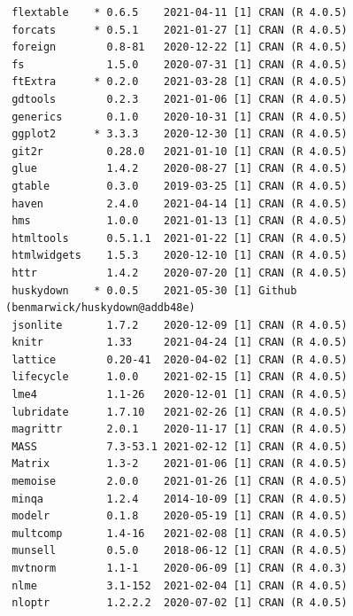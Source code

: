 \documentclass [11pt, proquest] {uwthesis}[2015/03/03]
\begin{document}
\begin{verbatim}
 flextable    * 0.6.5    2021-04-11 [1] CRAN (R 4.0.5)                       
 forcats      * 0.5.1    2021-01-27 [1] CRAN (R 4.0.5)                       
 foreign        0.8-81   2020-12-22 [1] CRAN (R 4.0.5)                       
 fs             1.5.0    2020-07-31 [1] CRAN (R 4.0.5)                       
 ftExtra      * 0.2.0    2021-03-28 [1] CRAN (R 4.0.5)                       
 gdtools        0.2.3    2021-01-06 [1] CRAN (R 4.0.5)                       
 generics       0.1.0    2020-10-31 [1] CRAN (R 4.0.5)                       
 ggplot2      * 3.3.3    2020-12-30 [1] CRAN (R 4.0.5)                       
 git2r          0.28.0   2021-01-10 [1] CRAN (R 4.0.5)                       
 glue           1.4.2    2020-08-27 [1] CRAN (R 4.0.5)                       
 gtable         0.3.0    2019-03-25 [1] CRAN (R 4.0.5)                       
 haven          2.4.0    2021-04-14 [1] CRAN (R 4.0.5)                       
 hms            1.0.0    2021-01-13 [1] CRAN (R 4.0.5)                       
 htmltools      0.5.1.1  2021-01-22 [1] CRAN (R 4.0.5)                       
 htmlwidgets    1.5.3    2020-12-10 [1] CRAN (R 4.0.5)                       
 httr           1.4.2    2020-07-20 [1] CRAN (R 4.0.5)                       
 huskydown    * 0.0.5    2021-05-30 [1] Github (benmarwick/huskydown@addb48e)
 jsonlite       1.7.2    2020-12-09 [1] CRAN (R 4.0.5)                       
 knitr          1.33     2021-04-24 [1] CRAN (R 4.0.5)                       
 lattice        0.20-41  2020-04-02 [1] CRAN (R 4.0.5)                       
 lifecycle      1.0.0    2021-02-15 [1] CRAN (R 4.0.5)                       
 lme4           1.1-26   2020-12-01 [1] CRAN (R 4.0.5)                       
 lubridate      1.7.10   2021-02-26 [1] CRAN (R 4.0.5)                       
 magrittr       2.0.1    2020-11-17 [1] CRAN (R 4.0.5)                       
 MASS           7.3-53.1 2021-02-12 [1] CRAN (R 4.0.5)                       
 Matrix         1.3-2    2021-01-06 [1] CRAN (R 4.0.5)                       
 memoise        2.0.0    2021-01-26 [1] CRAN (R 4.0.5)                       
 minqa          1.2.4    2014-10-09 [1] CRAN (R 4.0.5)                       
 modelr         0.1.8    2020-05-19 [1] CRAN (R 4.0.5)                       
 multcomp       1.4-16   2021-02-08 [1] CRAN (R 4.0.5)                       
 munsell        0.5.0    2018-06-12 [1] CRAN (R 4.0.5)                       
 mvtnorm        1.1-1    2020-06-09 [1] CRAN (R 4.0.3)                       
 nlme           3.1-152  2021-02-04 [1] CRAN (R 4.0.5)                       
 nloptr         1.2.2.2  2020-07-02 [1] CRAN (R 4.0.5)                       

\end{verbatim}
\end{document}
